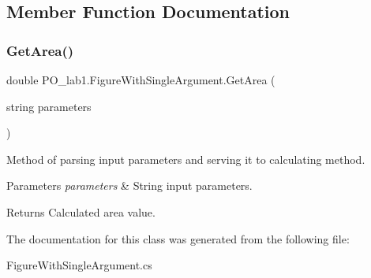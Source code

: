 \subsection{Member Function Documentation}
\mbox{\label{class_p_o__lab1_1_1_figure_with_single_argument_a19718a035b0cc6930df33d05e4e0a92f}} 
\subsubsection{\texorpdfstring{Get\+Area()}{GetArea()}}
{\footnotesize\ttfamily double P\+O\+\_\+lab1.\+Figure\+With\+Single\+Argument.\+Get\+Area (\begin{DoxyParamCaption}\item[{string}]{parameters }\end{DoxyParamCaption})\hspace{0.3cm}{\ttfamily [inline]}}



Method of parsing input parameters and serving it to calculating method. 


\begin{DoxyParams}{Parameters}
{\em parameters} & String input parameters.\\
\hline
\end{DoxyParams}
\begin{DoxyReturn}{Returns}
Calculated area value.
\end{DoxyReturn}


The documentation for this class was generated from the following file\+:\begin{DoxyCompactItemize}
\item 
Figure\+With\+Single\+Argument.\+cs\end{DoxyCompactItemize}
